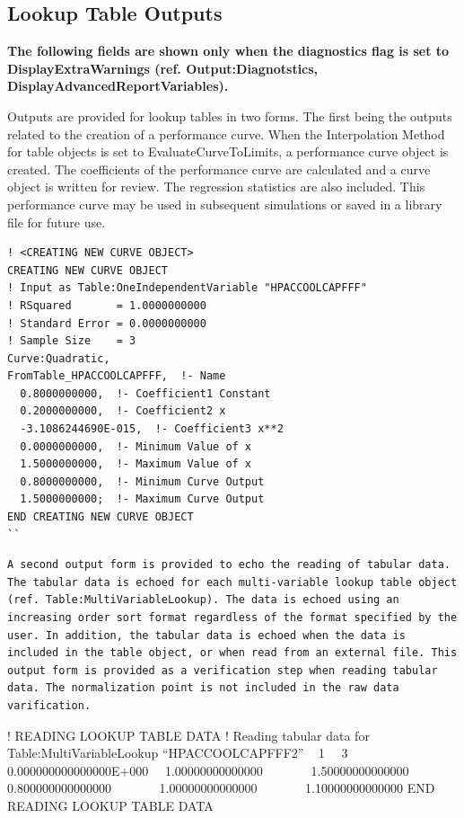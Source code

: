 \subsection{Lookup Table Outputs}\label{lookup-table-outputs}

\textbf{The following fields are shown only when the diagnostics flag is set to DisplayExtraWarnings (ref. Output:Diagnotstics, DisplayAdvancedReportVariables).}

Outputs are provided for lookup tables in two forms. The first being the outputs related to the creation of a performance curve. When the Interpolation Method for table objects is set to EvaluateCurveToLimits, a performance curve object is created. The coefficients of the performance curve are calculated and a curve object is written for review. The regression statistics are also included. This performance curve may be used in subsequent simulations or saved in a library file for future use.

\begin{lstlisting}
! <CREATING NEW CURVE OBJECT>
CREATING NEW CURVE OBJECT
! Input as Table:OneIndependentVariable "HPACCOOLCAPFFF"
! RSquared       = 1.0000000000
! Standard Error = 0.0000000000
! Sample Size    = 3
Curve:Quadratic,
FromTable_HPACCOOLCAPFFF,  !- Name
  0.8000000000,  !- Coefficient1 Constant
  0.2000000000,  !- Coefficient2 x
  -3.1086244690E-015,  !- Coefficient3 x**2
  0.0000000000,  !- Minimum Value of x
  1.5000000000,  !- Maximum Value of x
  0.8000000000,  !- Minimum Curve Output
  1.5000000000;  !- Maximum Curve Output
END CREATING NEW CURVE OBJECT
``
\end{lstlisting}

\begin{lstlisting}
A second output form is provided to echo the reading of tabular data. The tabular data is echoed for each multi-variable lookup table object (ref. Table:MultiVariableLookup). The data is echoed using an increasing order sort format regardless of the format specified by the user. In addition, the tabular data is echoed when the data is included in the table object, or when read from an external file. This output form is provided as a verification step when reading tabular data. The normalization point is not included in the raw data varification.
\end{lstlisting}

! READING LOOKUP TABLE DATA ! Reading tabular data for Table:MultiVariableLookup ``HPACCOOLCAPFFF2'' ~ 1~~ 3 ~ 0.000000000000000E+000~~ 1.00000000000000~~~~~~~ 1.50000000000000 ~ 0.800000000000000~~~~~~~ 1.00000000000000~~~~~~~ 1.10000000000000 END READING LOOKUP TABLE DATA

